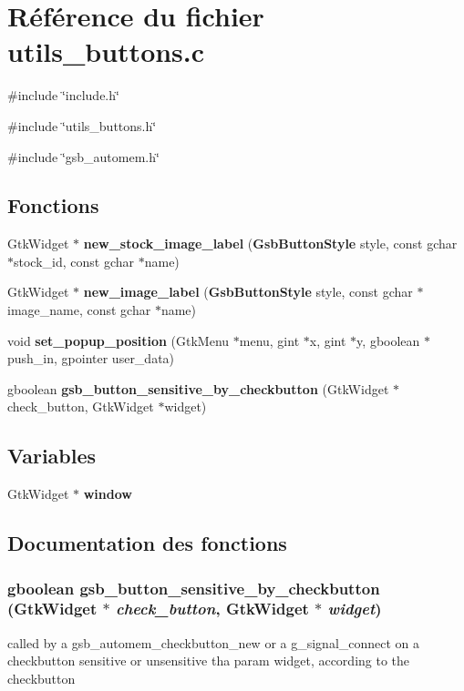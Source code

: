\section{Référence du fichier utils\_\-buttons.c}
\label{utils__buttons_8c}
{\ttfamily \#include \char`\"{}include.h\char`\"{}}\par
{\ttfamily \#include \char`\"{}utils\_\-buttons.h\char`\"{}}\par
{\ttfamily \#include \char`\"{}gsb\_\-automem.h\char`\"{}}\par
\subsection*{Fonctions}
\begin{DoxyCompactItemize}
\item 
GtkWidget $\ast$ {\bf new\_\-stock\_\-image\_\-label} ({\bf GsbButtonStyle} style, const gchar $\ast$stock\_\-id, const gchar $\ast$name)
\item 
GtkWidget $\ast$ {\bf new\_\-image\_\-label} ({\bf GsbButtonStyle} style, const gchar $\ast$image\_\-name, const gchar $\ast$name)
\item 
void {\bf set\_\-popup\_\-position} (GtkMenu $\ast$menu, gint $\ast$x, gint $\ast$y, gboolean $\ast$push\_\-in, gpointer user\_\-data)
\item 
gboolean {\bf gsb\_\-button\_\-sensitive\_\-by\_\-checkbutton} (GtkWidget $\ast$check\_\-button, GtkWidget $\ast$widget)
\end{DoxyCompactItemize}
\subsection*{Variables}
\begin{DoxyCompactItemize}
\item 
GtkWidget $\ast$ {\bf window}
\end{DoxyCompactItemize}


\subsection{Documentation des fonctions}
\subsubsection[{gsb\_\-button\_\-sensitive\_\-by\_\-checkbutton}]{\setlength{\rightskip}{0pt plus 5cm}gboolean gsb\_\-button\_\-sensitive\_\-by\_\-checkbutton (GtkWidget $\ast$ {\em check\_\-button}, \/  GtkWidget $\ast$ {\em widget})}\label{utils__buttons_8c_ad3fabcee0e67c73921725cf708b29be1}
called by a gsb\_\-automem\_\-checkbutton\_\-new or a g\_\-signal\_\-connect on a checkbutton sensitive or unsensitive tha param widget, according to the checkbutton


